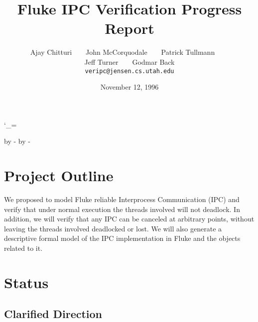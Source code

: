 %
%

     

\catcode`\_=\active 

\long{}
\long{}


\topmargin 0pt
\advance \topmargin by -\headheight
\advance \topmargin by -\headsep
\textheight 8.9in
\oddsidemargin 0.3in  
\evensidemargin \oddsidemargin
\marginparwidth 0.5in
\textwidth 6in

%

\title{\bf \Large Fluke IPC Verification Progress Report}

\author{Ajay Chitturi~~~~John McCorquodale~~~~Patrick Tullmann~~~~\\
	Jeff Turner~~~~Godmar Back \\[2ex]
	{\tt veripc@jensen.cs.utah.edu}
	}

\date{November 12, 1996}



\maketitle

\section*{Project Outline}

We proposed to model Fluke reliable Interprocess Communication (IPC)
and verify that under normal execution the threads involved
will not deadlock.  In addition, we will verify that any IPC can be canceled
at arbitrary points, without leaving the threads involved deadlocked
or lost.  We will also generate a descriptive formal model of the IPC
implementation in Fluke and the objects related to it.

\section*{Status}

\subsection*{Clarified Direction}

